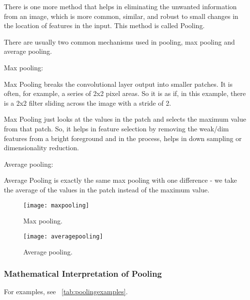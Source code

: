	\begin{bulletedlist}
		\item There is one more method that helps in eliminating the unwanted information from an image, which is more common, similar, and robust to small changes in the location of features in the input. This method is called Pooling.
		\item There are usually two common mechanisms used in pooling, max pooling and average pooling.
		\item Max pooling:
		\begin{bulletedlist}
			\item Max Pooling breaks the convolutional layer output into smaller patches. It is often, for example, a series of 2x2 pixel areas. So it is as if, in this example, there is a 2x2 filter sliding across the image with a stride of 2.
			\item Max Pooling just looks at the values in the patch and selects the maximum value from that patch. So, it helps in feature selection by removing the weak/dim features from a bright foreground and in the process, helps in down sampling or dimensionality reduction.
		\end{bulletedlist}
		\item Average pooling:
		\begin{bulletedlist}
			\item Average Pooling is exactly the same max pooling with one difference - we take the average of the values in the patch instead of the maximum value.
		\end{bulletedlist}
	\end{bulletedlist}

	\begin{figure}[h]
		\centering
		\texttt{[image: maxpooling]}
		\caption[Max pooling]{Max pooling.}
		\label{fig:maxpooling}
	\end{figure}

	\begin{figure}[h]
		\centering
		\texttt{[image: averagepooling]}
		\caption[Average pooling]{Average pooling.}
		\label{fig:averagepooling}
	\end{figure}

	\subsubsection{Mathematical Interpretation of Pooling}
For examples, see \tablename~\ref{tab:poolingexamples}.

